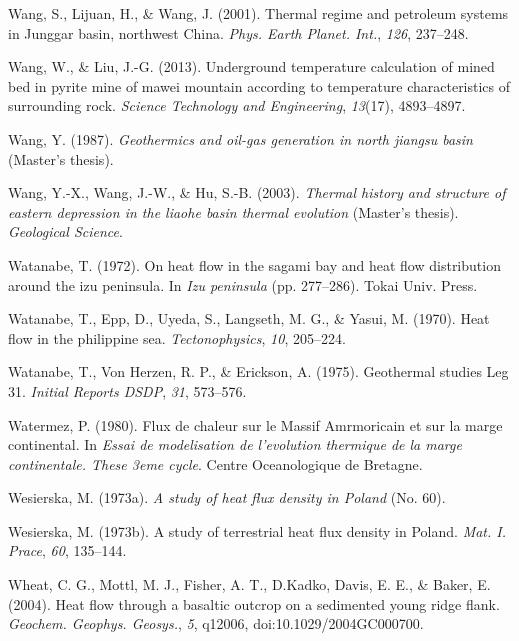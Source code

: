 \begin{CSLReferences}{1}{1}
\leavevmode{}%
Wang, S., Lijuan, H., \& Wang, J. (2001). Thermal regime and petroleum systems in {Junggar} basin, northwest {China}. \emph{Phys. Earth Planet. Int.}, \emph{126}, 237--248.

\leavevmode{}%
Wang, W., \& Liu, J.-G. (2013). Underground temperature calculation of mined bed in pyrite mine of mawei mountain according to temperature characteristics of surrounding rock. \emph{Science Technology and Engineering}, \emph{13}(17), 4893--4897.

\leavevmode{}%
Wang, Y. (1987). \emph{Geothermics and oil-gas generation in north jiangsu basin} (Master's thesis).

\leavevmode{}%
Wang, Y.-X., Wang, J.-W., \& Hu, S.-B. (2003). \emph{Thermal history and structure of eastern depression in the liaohe basin thermal evolution} (Master's thesis). \emph{Geological Science}.

\leavevmode{}%
Watanabe, T. (1972). On heat flow in the sagami bay and heat flow distribution around the izu peninsula. In \emph{Izu peninsula} (pp. 277--286). Tokai Univ. Press.

\leavevmode{}%
Watanabe, T., Epp, D., Uyeda, S., Langseth, M. G., \& Yasui, M. (1970). Heat flow in the philippine sea. \emph{Tectonophysics}, \emph{10}, 205--224.

\leavevmode{}%
Watanabe, T., Von Herzen, R. P., \& Erickson, A. (1975). Geothermal studies {Leg} 31. \emph{Initial Reports DSDP}, \emph{31}, 573--576.

\leavevmode{}%
Watermez, P. (1980). Flux de chaleur sur le {Massif Amrmoricain} et sur la marge continental. In \emph{Essai de modelisation de l'evolution thermique de la marge continentale. These 3eme cycle}. Centre Oceanologique de Bretagne.

\leavevmode{}%
Wesierska, M. (1973a). \emph{A study of heat flux density in {Poland}} (No. 60).

\leavevmode{}%
Wesierska, M. (1973b). A study of terrestrial heat flux density in {Poland}. \emph{Mat. I. Prace}, \emph{60}, 135--144.

\leavevmode{}%
Wheat, C. G., Mottl, M. J., Fisher, A. T., D.Kadko, Davis, E. E., \& Baker, E. (2004). Heat flow through a basaltic outcrop on a sedimented young ridge flank. \emph{Geochem. Geophys. Geosys.}, \emph{5}, q12006, doi:10.1029/2004GC000700.


\end{CSLReferences}
